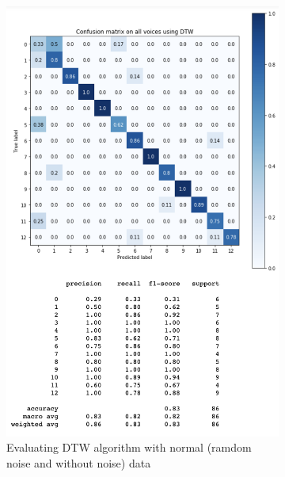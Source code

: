\documentclass[%
  article,%
  10pt,%
  a4paper,%
  fleqn,%
  oneside,%
  sumario = tradicional,%
  chapter = TITLE,%
  section = TITLE,%
]{abntex2}
\begin{document}
\begin{figure}
\centering
\begin{minipage}[b]{.4\textwidth}
\begin{figure}[H]
  \centering
  \includegraphics[width = \columnwidth]{./Figuras/dtwall}
  \caption{Evaluating DTW algorithm with normal (ramdom noise and without noise) data}
  \label{fig:dtwall}
\end{figure}
\end{minipage}\qquad
\begin{minipage}[b]{.4\textwidth}
\begin{figure}[H]
  \centering

\end{figure}
\end{minipage}
\end{figure}
\end{document}

